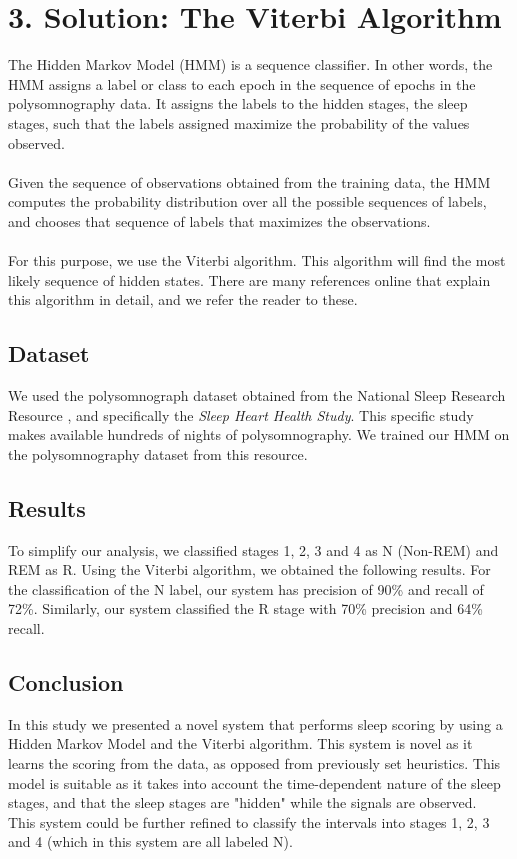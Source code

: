 \documentclass[10pt,a4paper]{report}
\begin{document}
\section*{3. Solution: The Viterbi Algorithm}
The Hidden Markov Model (HMM) is a sequence classifier. In other words, the HMM assigns a label or class to each epoch in the sequence of epochs in the polysomnography data. It assigns the labels to the hidden stages, the sleep stages, such that the labels assigned maximize the probability of the values observed. 
\\\\
Given the sequence of observations obtained from the training data, the HMM computes the probability distribution over all the possible sequences of labels, and chooses that sequence of labels that maximizes the observations.
\\\\
For this purpose, we use the Viterbi algorithm. This algorithm will find the most likely sequence of hidden states. There are many references online that explain this algorithm in detail, and we refer the reader to these. 

\subsection*{Dataset}
We used the polysomnograph dataset obtained from the National Sleep Research Resource \cite{sleepdata}, and specifically the \textit{Sleep Heart Health Study}. This specific study makes available hundreds of nights of polysomnography. We trained our HMM on the polysomnography dataset from this resource.

\subsection*{Results}
To simplify our analysis, we classified stages 1, 2, 3 and 4 as N (Non-REM) and REM as R. Using the Viterbi algorithm, we obtained the following results. For the classification of the N label, our system has precision of 90\% and recall of 72\%. Similarly, our system classified the R stage with 70\% precision and 64\% recall.

\subsection*{Conclusion}
In this study we presented a novel system that performs sleep scoring by using a Hidden Markov Model and the Viterbi algorithm. This system is novel as it learns the scoring from the data, as opposed from previously set heuristics. This model is suitable as it takes into account the time-dependent nature of the sleep stages, and that the sleep stages are "hidden" while the signals are observed.
\\
This system could be further refined to classify the intervals into stages 1, 2, 3 and 4 (which in this system are all labeled N). 
\end{document}
